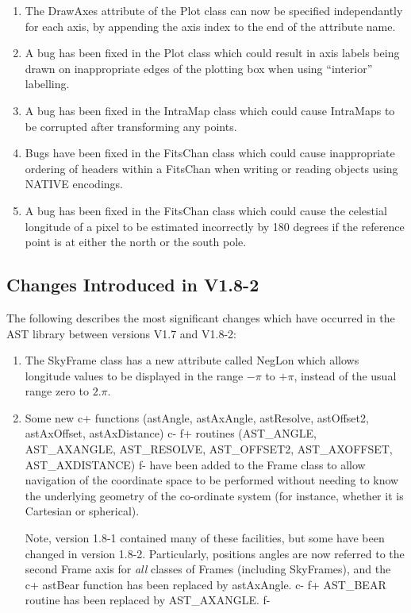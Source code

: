 \documentclass[twoside,11pt]{article}
\begin{document}
\begin{enumerate}
\item The DrawAxes attribute of the Plot class can now be specified
independantly for each axis, by appending the axis index to the
end of the attribute name.

\item A bug has been fixed in the Plot class which could result in axis
labels being drawn on inappropriate edges of the plotting box when using
``interior'' labelling.

\item A bug has been fixed in the IntraMap class which could cause IntraMaps
to be corrupted after transforming any points.

\item Bugs have been fixed in the FitsChan class which could cause
inappropriate ordering of headers within a FitsChan when writing or
reading objects using NATIVE encodings.

\item A bug has been fixed in the FitsChan class which could cause the
celestial longitude of a pixel to be estimated incorrectly by 180 degrees
if the reference point is at either the north or the south pole.

\end{enumerate}


\subsection{Changes Introduced in V1.8-2}

The following describes the most significant changes which have
occurred in the AST library between versions V1.7 and V1.8-2:

\begin{enumerate}

\item The SkyFrame class has a new attribute called NegLon which allows
   longitude values to be displayed in the range $-\pi$ to $+\pi$, instead
   of the usual range zero to $2.\pi$.

\item Some new
c+
functions (astAngle, astAxAngle, astResolve, astOffset2, astAxOffset,
astAxDistance)
c-
f+
routines (AST\_ANGLE, AST\_AXANGLE, AST\_RESOLVE, AST\_OFFSET2, AST\_AXOFFSET,
AST\_AXDISTANCE)
f-
have been added to the Frame class to allow navigation of the coordinate space
to be performed without needing to know the underlying geometry
of the co-ordinate system (for instance, whether it is Cartesian or
spherical).

Note, version 1.8-1 contained many of these facilities, but
some have been changed in version 1.8-2. Particularly, positions angles
are now referred to the second Frame axis for {\em all} classes of Frames
(including SkyFrames), and the
c+
astBear function has been replaced by astAxAngle.
c-
f+
AST\_BEAR routine has been replaced by AST\_AXANGLE.
f-

\end{enumerate}
\end{document}

